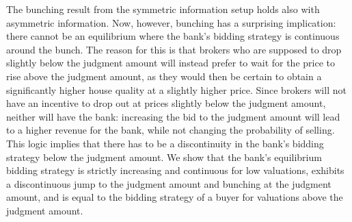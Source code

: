 \documentclass[11pt,twopage]{article}
\begin{document}
The bunching result from the symmetric information setup holds also with asymmetric information. Now, however, bunching has a
surprising implication:
there cannot be an equilibrium where the bank's bidding strategy is
continuous around the bunch. The reason for this is that brokers who
are supposed to drop slightly below the judgment amount will instead
prefer to wait for the price to rise above the judgment amount, as
they would then be certain to obtain a significantly higher house
quality at a slightly higher price. Since brokers will not have an
incentive to drop out at prices slightly below the judgment amount,
neither will have the bank: increasing the bid to the judgment amount
will lead to a higher revenue for the bank, while not changing the
probability of selling. This logic implies that there has to be a
discontinuity in the bank's bidding strategy below the judgment
amount. We show that the bank's equilibrium bidding strategy is
strictly increasing and continuous for low valuations, exhibits a
discontinuous jump to the judgment amount and bunching at the judgment
amount, and is equal to the bidding strategy of a buyer for valuations
above the judgment amount.
\end{document}

